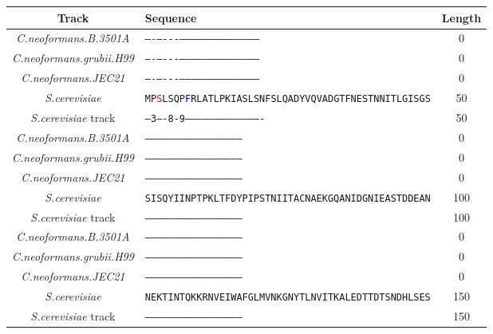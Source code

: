 \begin{table}[htp]\footnotesize
\begin{tabular}{|c|l|c|} \hline
\textbf{Track} & \textbf{Sequence} & \textbf{Length}\\ \hline
\textit{C.neoformans.B.3501A} & \texttt{--\textcolor{red}{-}----\textcolor{blue}{-}{\color[rgb]{0,0.6,0}-}-----------------------------------------} & 0
\\
\textit{C.neoformans.grubii.H99} & \texttt{--\textcolor{red}{-}----\textcolor{blue}{-}{\color[rgb]{0,0.6,0}-}-----------------------------------------} & 0
\\
\textit{C.neoformans.JEC21} & \texttt{--\textcolor{red}{-}----\textcolor{blue}{-}{\color[rgb]{0,0.6,0}-}-----------------------------------------} & 0
\\
\textit{S.cerevisiae} & \texttt{MP\textcolor{red}{S}LSQP\textcolor{blue}{F}{\color[rgb]{0,0.6,0}R}LATLPKIASLSNFSLQADYVQVADGTFNESTNNITLGISGS} & 50
\\
\textit{S.cerevisiae} track & \texttt{--3----8-9----------------------------------------} & 50
\\
\hline
\textit{C.neoformans.B.3501A} & \texttt{--------------------------------------------------} & 0
\\
\textit{C.neoformans.grubii.H99} & \texttt{--------------------------------------------------} & 0
\\
\textit{C.neoformans.JEC21} & \texttt{--------------------------------------------------} & 0
\\
\textit{S.cerevisiae} & \texttt{SISQYIINPTPKLTFDYPIPSTNIITACNAEKGQANIDGNIEASTDDEAN} & 100
\\
\textit{S.cerevisiae} track & \texttt{--------------------------------------------------} & 100
\\
\hline
\textit{C.neoformans.B.3501A} & \texttt{--------------------------------------------------} & 0
\\
\textit{C.neoformans.grubii.H99} & \texttt{--------------------------------------------------} & 0
\\
\textit{C.neoformans.JEC21} & \texttt{--------------------------------------------------} & 0
\\
\textit{S.cerevisiae} & \texttt{NEKTINTQKKRNVEIWAFGLMVNKGNYTLNVITKALEDTTDTSNDHLSES} & 150
\\
\textit{S.cerevisiae} track & \texttt{--------------------------------------------------} & 150

\end{tabular}
\end{table}
